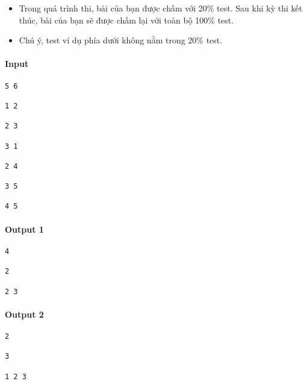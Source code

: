 \begin{itemize}
	\item Trong quá trình thi, bài của bạn được chấm với 20\% test. Sau khi kỳ thi kết thúc, bài của bạn sẽ được chấm lại với toàn bộ 100\% test.
	\item Chú ý, test ví dụ phía dưới không nằm trong 20\% test.
\end{itemize}
\paragraph{Input}
\begin{verbatim}
5 6

1 2

2 3

3 1

2 4

3 5

4 5

\end{verbatim}

\paragraph{Output 1}
\begin{verbatim}
4

2

2 3

\end{verbatim}

\paragraph{Output 2}
\begin{verbatim}
2

3

1 2 3

\end{verbatim}